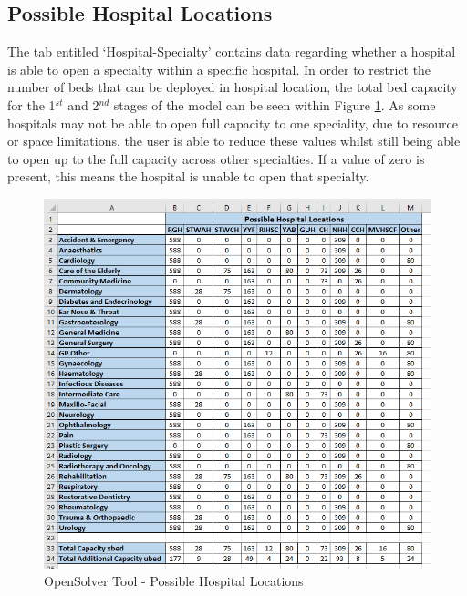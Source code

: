 \documentclass[../thesis.tex]{subfiles}
\begin{document}
\subsection*{Possible Hospital Locations}
The tab entitled `Hospital-Specialty' contains data regarding whether a hospital is able to open a specialty within a specific hospital. In order to restrict the number of beds that can be deployed in hospital location, the total bed capacity for the 1$^{st}$ and 2$^{nd}$ stages of the model can be seen within Figure \ref{fig:exlocations}. As some hospitals may not be able to open full capacity to one speciality, due to resource or space limitations, the user is able to reduce these values whilst still being able to open up to the full capacity across other specialties. If a value of zero is present, this means the hospital is unable to open that specialty.
\begin{figure}[h!]
    \centering
    \includegraphics{Chapters/Chapter7/Figures/Hospital-Spec.png}
    \caption{OpenSolver Tool - Possible Hospital Locations}
    \label{fig:exlocations}
\end{figure}
\end{document}
